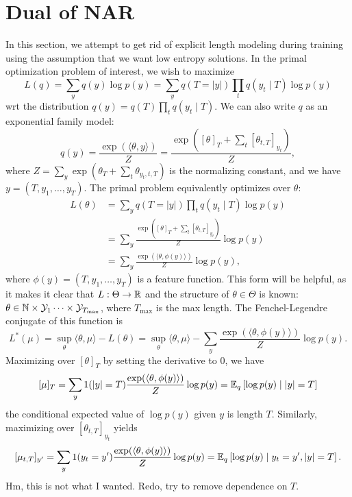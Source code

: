 \documentclass[11pt]{article}
\begin{document}
\section{Dual of NAR}
In this section, we attempt to get rid of explicit length modeling during training
using the assumption that we want low entropy solutions.
In the primal optimization problem of interest, we wish to maximize
\begin{equation}
    L(q) = \sum_{y} q(y) \log p(y)
    = \sum_{y} q(T = |y|) \prod_t q(y_t \mid T)\log p(y)
\end{equation}
wrt the distribution $q(y) = q(T)\prod_t q(y_t \mid T)$.
We can also write $q$ as an exponential family model:
$$q(y)
= \frac{\exp(\langle \theta, y \rangle)}{Z}
= \frac{\exp([\theta]_T + \sum_t [\theta_{t, T}]_{y_t})}{Z},
$$
where $Z = \sum_y \exp(\theta_T + \sum_t \theta_{y_t,t,T})$ is the normalizing constant,
and we have $y = (T, y_1, \ldots, y_T)$.
The primal problem equivalently optimizes over $\theta$:
\begin{equation}
    \begin{aligned}
    L(\theta)
    &= \sum_{y} q(T = |y|) \prod_t q(y_t \mid T)\log p(y)\\
    &= \sum_y \frac{\exp([\theta]_T + \sum_t [\theta_{t,T}]_{y_t})}{Z} \log p(y)\\
    &= \sum_y \frac{\exp(\langle\theta, \phi(y)\rangle)}{Z} \log p(y),
    \end{aligned}
\end{equation}
where $\phi(y) = (T, y_1, \ldots, y_T)$ is a feature function.
This form will be helpful, as it makes it clear that $L: \Theta\to\mathbb{R}$
and the structure of $\theta\in\Theta$ is known:
$\theta\in\mathbb{N}\times\mathcal{Y}_1\cdots\times\mathcal{Y}_{T_{\max}}$, where $T_{\max}$ is the max length.
The Fenchel-Legendre conjugate of this function is
\begin{equation}
    L^*(\mu) = \sup_\theta \langle \theta, \mu\rangle - L(\theta)
        = \sup_\theta \langle \theta, \mu\rangle - \sum_y\frac{\exp(\langle\theta,\phi(y)\rangle)}{Z} \log p(y).
\end{equation}
Maximizing over $[\theta]_T$ by setting the derivative to 0, we have
$$
[\mu]_T = \sum_y 1(|y| = T)\frac{\exp(\langle\theta,\phi(y)\rangle)}{Z} \log p(y)
= \mathbb{E}_{q}\left[\log p(y) \mid |y| = T\right]
$$
the conditional expected value of $\log p(y)$ given $y$ is length $T$.
Similarly, maximizing over $[\theta_{t,T}]_{y_t}$ yields
$$
[\mu_{t,T}]_{y'} = \sum_y 1(y_t = y')\frac{\exp(\langle\theta,\phi(y)\rangle)}{Z} \log p(y)
= \mathbb{E}_{q}\left[\log p(y) \mid y_t = y', |y| = T\right].
$$
Hm, this is not what I wanted. Redo, try to remove dependence on $T$.
\end{document}
